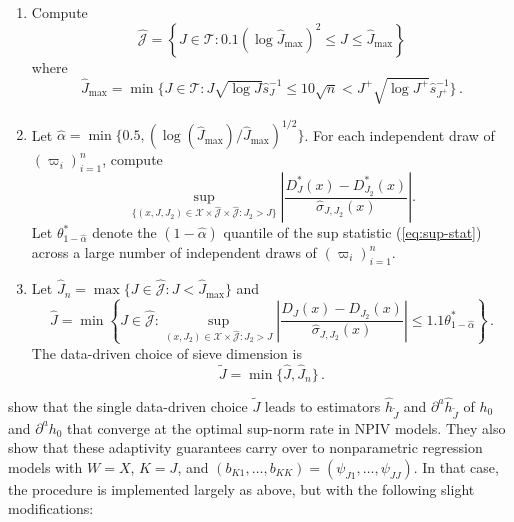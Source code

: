 \documentclass[
]{jss}
\begin{document}
\begin{enumerate}
\item Compute 
\begin{equation}\label{eq:index_set}
 \hat{\mathcal J}  = \left\{ J \in \mathcal T : 0.1 ( \log \hat J_{\max})^2 \leq J \leq \hat J_{\max}\right\}
\end{equation}
where
\begin{equation} \label{eq:J_hat_max}
 \hat{J}_{\max} = \min \bigg \{ J \in \mathcal T :   J \sqrt{\log J}  \hat{s}_J^{-1}     \leq 10 \sqrt{n}  <  J^{+} \sqrt{\log J^{+}}   \hat{s}_{J^{+}}^{-1}  \bigg \} \,.
\end{equation}
\item Let $\hat \alpha = \min\{ 0.5 , (\log(\hat{J}_{\max})/\hat{J}_{\max})^{1/2}\}$.  For each independent draw of $(\varpi_i)_{i=1}^n$, compute
\begin{equation}\label{eq:sup-stat}
 \sup_{\{ (x,J,J_2) \in \mathcal{X} \times \hat{\mathcal J} \times \hat{\mathcal J} : J_2 > J \}} \left| \frac{D_{J}^*(x)-D_{J_2}^*(x)}{\hat \sigma_{J,J_2}(x)} \right|.
\end{equation}
Let $\theta^*_{1-\hat \alpha}$ denote the $(1- \hat \alpha )$ quantile of the sup statistic (\ref{eq:sup-stat}) across a large number  of independent draws of $(\varpi_i)_{i=1}^n$.
\item Let $\hat J_n = \max\{J \in \hat{\mathcal J} : J < \hat J_{\max}\}$ and
\begin{equation}\label{eq:J_lepski}
 \hat{J} = \min \left \{ J \in \hat{\mathcal J} : \sup_{(x, J_2) \in \mathcal{X} \times \hat{\mathcal{J}} : J_2 > J } \left| \frac{D_{J}(x)-D_{J_2}(x)}{\hat \sigma_{J,J_2}(x)} \right| \leq 1.1 \theta^*_{1 - \hat \alpha} \right \} \,.
\end{equation}
The data-driven choice of sieve dimension is
\begin{equation} \label{eq:J-choice}
 \tilde{J} = \min\{\hat{J},\hat J_n\}\,.
\end{equation}
\end{enumerate}

\citet{CCK} show that the single data-driven choice \(\tilde J\) leads
to estimators \(\hat h_{\tilde J}\) and \(\partial^a \hat h_{\tilde J}\)
of \(h_0\) and \(\partial^a h_0\) that converge at the optimal sup-norm
rate in NPIV models. They also show that these adaptivity guarantees
carry over to nonparametric regression models with \(W = X\), \(K = J\),
and \((b_{K1},\ldots,b_{KK}) = (\psi_{J1},\ldots,\psi_{JJ})\). In that
case, the procedure is implemented largely as above, but with the
following slight modifications:
\end{document}
